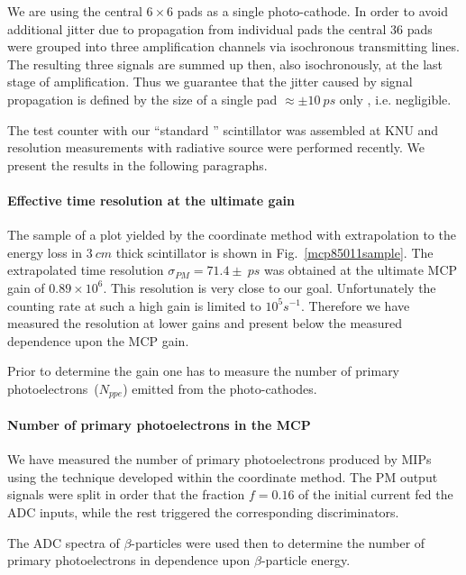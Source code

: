 We are using the central $6\times6$ pads as a single photo-cathode.  
In order to avoid additional jitter due to  propagation from individual pads
the central 36 pads were grouped into three amplification channels
via isochronous transmitting lines.  
The resulting three  signals are summed up then, 
also isochronously, at the last stage of amplification.  
Thus we guarantee that the  jitter caused  by signal propagation  is  
defined by the size of a single pad  $\approx\pm10~ps$ only , i.e. negligible.

The test counter with our ``standard '' scintillator 
was assembled at KNU and resolution measurements with radiative 
source were performed recently\cite{reme85011}. We present the results in the following paragraphs.

\paragraph*{Effective time resolution at the ultimate gain}
The sample of a  plot yielded by the  coordinate method with extrapolation to 
the energy loss in $3~cm$ thick scintillator is
shown  in Fig.~\ref{mcp85011sample}. The extrapolated time resolution 
  $\sigma_{PM}=71.4\pm~ps$ was obtained at 
the   ultimate MCP gain of  $0.89\times10^6$.
This resolution  is  very close to our goal.
Unfortunately  the counting rate at such a high gain is limited to $10^5s^{-1}$\cite{Baturin:2005}.
Therefore we have measured the resolution at lower gains and present below the measured 
dependence upon the MCP gain.  

Prior  to determine the  gain  one has to  measure   the number of 
primary photoelectrons~($N_{ppe}$) emitted from the photo-cathodes. 

\paragraph*{Number of primary photoelectrons in the MCP}
We have measured the number of 
primary photoelectrons produced by MIPs
using the technique developed within the coordinate method\cite{Baturin:2005}.
   The PM output signals were split in order that  the fraction $f=0.16$ of the initial current fed 
 the ADC inputs, while the rest
triggered the corresponding  discriminators.
 
The ADC spectra of $\beta$-particles 
were used then  to determine the number of primary photoelectrons in dependence upon $\beta$-particle energy.
 

